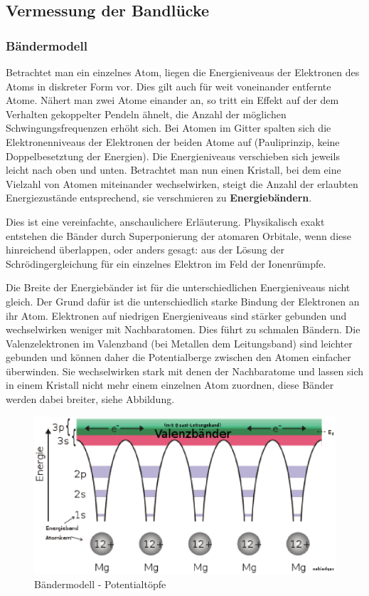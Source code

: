 \documentclass[12pt]{article}
\begin{document}
\subsection{Vermessung der Bandlücke}

\subsubsection{Bändermodell}
Betrachtet man ein einzelnes Atom, liegen die Energieniveaus der Elektronen des Atoms in diskreter Form vor. Dies gilt 
auch für weit voneinander entfernte Atome. 
Nähert man zwei Atome einander an, so tritt ein Effekt auf der dem Verhalten gekoppelter Pendeln ähnelt, die Anzahl der möglichen Schwingungsfrequenzen erhöht sich. Bei Atomen im Gitter spalten sich die Elektronenniveaus
der Elektronen der beiden Atome auf (Pauliprinzip, keine Doppelbesetztung der Energien). Die Energieniveaus 
verschieben sich jeweils leicht nach oben und unten. Betrachtet man nun einen Kristall, bei dem eine Vielzahl 
von Atomen miteinander wechselwirken, steigt die Anzahl der erlaubten Energiezustände entsprechend, sie 
verschmieren zu \textbf{Energiebändern}.

Dies ist eine vereinfachte, anschaulichere Erläuterung. Physikalisch exakt entstehen die Bänder durch Superponierung der
atomaren Orbitale, wenn diese hinreichend überlappen, oder anders gesagt: aus der Lösung der Schrödingergleichung für
ein einzelnes Elektron im Feld der Ionenrümpfe.

Die Breite der Energiebänder ist für die unterschiedlichen Energieniveaus nicht gleich. Der Grund dafür ist
die unterschiedlich starke Bindung der Elektronen an ihr Atom. Elektronen auf niedrigen Energieniveaus sind stärker
gebunden und wechselwirken weniger mit Nachbaratomen. Dies führt zu schmalen Bändern. Die Valenzelektronen im Valenzband
(bei Metallen dem Leitungsband) sind leichter gebunden und können daher die Potentialberge zwischen den Atomen
einfacher überwinden. Sie wechselwirken stark mit denen der Nachbaratome und lassen sich in einem Kristall nicht mehr 
einem einzelnen Atom zuordnen, diese Bänder werden dabei breiter, siehe Abbildung.

\begin{figure}[H]
\centering
\includegraphics[width=0.9\linewidth]{pictures/baendermodell.eps}
\caption{Bändermodell - Potentialtöpfe}
\end{figure}
\end{document}
